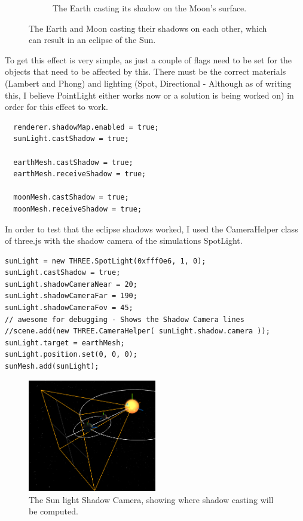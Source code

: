 \documentclass[12pt]{article}
\begin{document}
\begin{figure}[H]
\begin{subfigure}[b]{0.4\textwidth}
                \caption{The Earth casting its shadow on the Moon's surface.}
                \label{fig:The Earth casting its shadow on the Moon's surface.}
	 \end{subfigure}
	 \caption{The Earth and Moon casting their shadows on each other, which can result in an eclipse of the Sun.}
\end{figure}

To get this effect is very simple, as just a couple of flags need to be set for the objects that need to be affected by this. There must be the correct materials (Lambert and Phong) and lighting (Spot, Directional - Although as of writing this, I believe PointLight either works now or a solution is being worked on) in order for this effect to work.
\begin{lstlisting}
  renderer.shadowMap.enabled = true;
  sunLight.castShadow = true;
  
  earthMesh.castShadow = true;
  earthMesh.receiveShadow = true;
  
  moonMesh.castShadow = true;
  moonMesh.receiveShadow = true;
\end{lstlisting}

In order to test that the eclipse shadows worked, I used the CameraHelper class of three.js with the shadow camera of the simulations SpotLight.
\begin{lstlisting}
sunLight = new THREE.SpotLight(0xfff0e6, 1, 0);
sunLight.castShadow = true;
sunLight.shadowCameraNear = 20;
sunLight.shadowCameraFar = 190;
sunLight.shadowCameraFov = 45;
// awesome for debugging - Shows the Shadow Camera lines
//scene.add(new THREE.CameraHelper( sunLight.shadow.camera ));
sunLight.target = earthMesh;    
sunLight.position.set(0, 0, 0);
sunMesh.add(sunLight);
\end{lstlisting}

\begin{figure}[H]
        \centering
                \includegraphics[width=0.5\textwidth]{images/shadowcamera}
                \caption{The Sun light Shadow Camera, showing where shadow casting will be computed.}
                \label{fig: The Shadow Camera.}
\end{figure}
\end{document}

